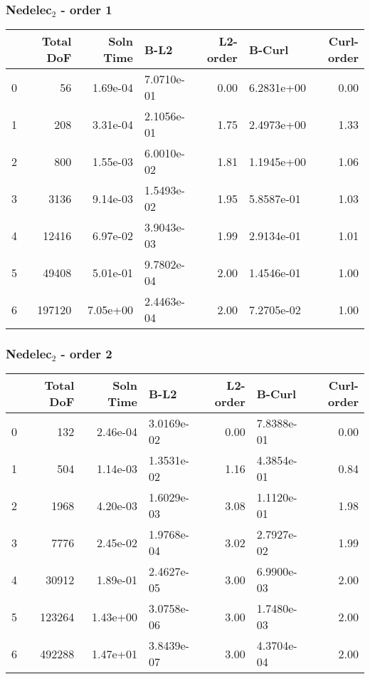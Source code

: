 \documentclass[12pt]{extarticle}
\numberwithin{equation}{section}    %
\begin{document}
\subsubsection*{Nedelec$_2$ - order 1}

\begin{tabular}{lrrlrlr}
\hline
{} &  Total DoF &  Soln Time &        B-L2 &  L2-order &      B-Curl &  Curl-order \\
\hline
0 &         56 &   1.69e-04 &  7.0710e-01 &     0.00 &  6.2831e+00 &        0.00 \\
1 &        208 &   3.31e-04 &  2.1056e-01 &     1.75 &  2.4973e+00 &        1.33 \\
2 &        800 &   1.55e-03 &  6.0010e-02 &     1.81 &  1.1945e+00 &        1.06 \\
3 &       3136 &   9.14e-03 &  1.5493e-02 &     1.95 &  5.8587e-01 &        1.03 \\
4 &      12416 &   6.97e-02 &  3.9043e-03 &     1.99 &  2.9134e-01 &        1.01 \\
5 &      49408 &   5.01e-01 &  9.7802e-04 &     2.00 &  1.4546e-01 &        1.00 \\
6 &     197120 &   7.05e+00 &  2.4463e-04 &     2.00 &  7.2705e-02 &        1.00 \\
\hline
\end{tabular}

\subsubsection*{Nedelec$_2$ - order 2}
\begin{tabular}{lrrlrlr}
\hline
{} &  Total DoF &  Soln Time &        B-L2 &  L2-order &      B-Curl &  Curl-order \\
\hline
0 &        132 &   2.46e-04 &  3.0169e-02 &     0.00 &  7.8388e-01 &        0.00 \\
1 &        504 &   1.14e-03 &  1.3531e-02 &     1.16 &  4.3854e-01 &        0.84 \\
2 &       1968 &   4.20e-03 &  1.6029e-03 &     3.08 &  1.1120e-01 &        1.98 \\
3 &       7776 &   2.45e-02 &  1.9768e-04 &     3.02 &  2.7927e-02 &        1.99 \\
4 &      30912 &   1.89e-01 &  2.4627e-05 &     3.00 &  6.9900e-03 &        2.00 \\
5 &     123264 &   1.43e+00 &  3.0758e-06 &     3.00 &  1.7480e-03 &        2.00 \\
6 &     492288 &   1.47e+01 &  3.8439e-07 &     3.00 &  4.3704e-04 &        2.00 \\
\hline
\end{tabular}
\end{document}
